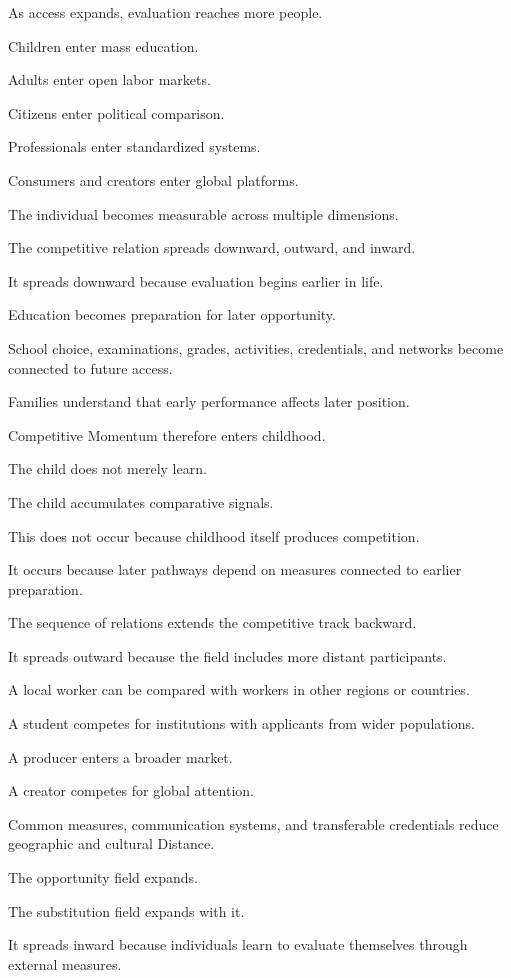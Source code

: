 As access expands, evaluation reaches more people.

Children enter mass education.

Adults enter open labor markets.

Citizens enter political comparison.

Professionals enter standardized systems.

Consumers and creators enter global platforms.

The individual becomes measurable across multiple dimensions.

The competitive relation spreads downward, outward, and inward.

It spreads downward because evaluation begins earlier in life.

Education becomes preparation for later opportunity.

School choice, examinations, grades, activities, credentials, and networks become connected to future access.

Families understand that early performance affects later position.

Competitive Momentum therefore enters childhood.

The child does not merely learn.

The child accumulates comparative signals.

This does not occur because childhood itself produces competition.

It occurs because later pathways depend on measures connected to earlier preparation.

The sequence of relations extends the competitive track backward.

It spreads outward because the field includes more distant participants.

A local worker can be compared with workers in other regions or countries.

A student competes for institutions with applicants from wider populations.

A producer enters a broader market.

A creator competes for global attention.

Common measures, communication systems, and transferable credentials reduce geographic and cultural Distance.

The opportunity field expands.

The substitution field expands with it.

It spreads inward because individuals learn to evaluate themselves through external measures.

